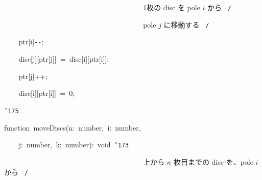 \documentclass[a4paper,10pt]{article}
\def\mc{\relax}
\begin{document}
\noindent
\mbox{}{\tt\mc \ }{\tt\mc \ }{\tt\mc \ }{\tt\mc \ }{\tt\mc \ }{\tt\mc \ }{\tt\mc \ }{\tt\mc \ }{\tt\mc \ }{\tt\mc \ }{\tt\mc \ }{\tt\mc \ }{\tt\mc \ }{\tt\mc \ }{\tt\mc \ }{\tt\mc \ }{\tt\mc \ }{\tt\mc \ }{\tt\mc \ }{\tt\mc \ }{\tt\mc \ }{\tt\mc \ }{\tt\mc \ }{\tt\mc \ }{\tt\mc \ }{\tt\mc \ }{\tt\mc \ }{\tt\mc \ }{\tt\mc \ }{\tt\mc \ }{\tt\mc \ }{\tt\mc \ }{\tt\mc \ }{\tt\mc \ }{\tt\mc \ }{\tt\mc \ }\rm\mc {\tt /}{\tt *}\  \ 1枚の disc を pole $i$ から \hfill \rm\mc \ {\tt *}{\tt /}
\tt\mc 

\noindent
\mbox{}{\tt\mc \ }{\tt\mc \ }{\tt\mc \ }{\tt\mc \ }{\tt\mc \ }{\tt\mc \ }{\tt\mc \ }{\tt\mc \ }{\tt\mc \ }{\tt\mc \ }{\tt\mc \ }{\tt\mc \ }{\tt\mc \ }{\tt\mc \ }{\tt\mc \ }{\tt\mc \ }{\tt\mc \ }{\tt\mc \ }{\tt\mc \ }{\tt\mc \ }{\tt\mc \ }{\tt\mc \ }{\tt\mc \ }{\tt\mc \ }{\tt\mc \ }{\tt\mc \ }{\tt\mc \ }{\tt\mc \ }{\tt\mc \ }{\tt\mc \ }{\tt\mc \ }{\tt\mc \ }{\tt\mc \ }{\tt\mc \ }{\tt\mc \ }{\tt\mc \ }\rm\mc {\tt /}{\tt *}\  \ pole $j$ に移動する \hfill \rm\mc \ {\tt *}{\tt /}
\tt\mc 

\noindent
\mbox{}{\tt\mc \ }{\tt\mc \ }{\tt\mc \ }{\tt\mc \ }ptr[i]{\tt -}{\tt -};

\noindent
\mbox{}{\tt\mc \ }{\tt\mc \ }{\tt\mc \ }{\tt\mc \ }disc[j][ptr[j]]{\tt\mc \ }={\tt\mc \ }disc[i][ptr[i]];

\noindent
\mbox{}{\tt\mc \ }{\tt\mc \ }{\tt\mc \ }{\tt\mc \ }ptr[j]++;

\noindent
\mbox{}{\tt\mc \ }{\tt\mc \ }{\tt\mc \ }{\tt\mc \ }disc[i][ptr[i]]{\tt\mc \ }={\tt\mc \ }0;

\noindent
\mbox{}{\tt\char'175}

\noindent
\mbox{}\hfill

\noindent
\mbox{}function{\tt\mc \ }moveDiscs(n:{\tt\mc \ }number,{\tt\mc \ }i:{\tt\mc \ }number,

\noindent
\mbox{}{\tt\mc \ }{\tt\mc \ }{\tt\mc \ }{\tt\mc \ }j:{\tt\mc \ }number,{\tt\mc \ }k:{\tt\mc \ }number):{\tt\mc \ }void{\tt\mc \ }{\tt\char'173}

\noindent
\mbox{}{\tt\mc \ }{\tt\mc \ }{\tt\mc \ }{\tt\mc \ }{\tt\mc \ }{\tt\mc \ }{\tt\mc \ }{\tt\mc \ }{\tt\mc \ }{\tt\mc \ }{\tt\mc \ }{\tt\mc \ }{\tt\mc \ }{\tt\mc \ }{\tt\mc \ }{\tt\mc \ }{\tt\mc \ }{\tt\mc \ }{\tt\mc \ }{\tt\mc \ }{\tt\mc \ }{\tt\mc \ }{\tt\mc \ }{\tt\mc \ }{\tt\mc \ }{\tt\mc \ }{\tt\mc \ }{\tt\mc \ }{\tt\mc \ }{\tt\mc \ }{\tt\mc \ }{\tt\mc \ }{\tt\mc \ }{\tt\mc \ }{\tt\mc \ }{\tt\mc \ }\rm\mc {\tt /}{\tt *}\  \ 上から $n$ 枚目までの disc を、pole $i$ から \hfill \rm\mc \ {\tt *}{\tt /}
\tt\mc 
\end{document}
